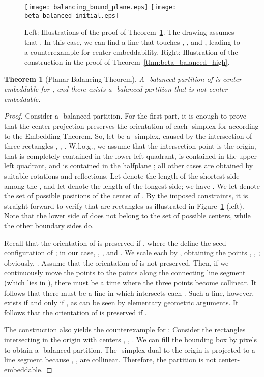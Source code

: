 \documentclass[12pt]{article}
\newtheorem{theorem}{Theorem}
\begin{document}
\begin{figure}
\centering
\texttt{[image: balancing\_bound\_plane.eps]}
\hspace{1cm}
\texttt{[image: beta\_balanced\_initial.eps]}
\caption{Left: Illustrations of the proof of Theorem~\ref{thm:planar_balancing}.
The drawing assumes that . In this case, we can find a line that touches
, , and , leading to a counterexample for center-embeddability.
Right: Illustration of the construction in the proof of Theorem~\ref{thm:beta_balanced_high}.}
\label{fig:worst_case_3d}
\label{fig:beta_balanced_plane}
\end{figure}

\begin{theorem}[Planar Balancing Theorem]\label{thm:planar_balancing}
A -balanced partition of  is center-embeddable for , and
there exists a -balanced partition that is not center-embeddable.
\end{theorem}
\begin{proof}
Consider a -balanced partition. For the first part, it is enough to prove that the center projection
preserves the orientation of each -simplex for  according to the Embedding Theorem.
So, let  be a -simplex, caused by the intersection of three rectangles , ,
. W.l.o.g., we assume that the intersection point is the origin, that  is completely
contained in the lower-left quadrant,  is contained in the upper-left quadrant,
and  is contained in the halfplane ; all other cases are obtained by 
suitable rotations and reflections. Let  denote the length of the shortest side
among the , and let  denote the length of the longest side; we have .
We let  denote the set of possible positions of the center of . 
By the imposed constraints, it is straight-forward to verify that 
are rectangles as illustrated in Figure~\ref{fig:beta_balanced_plane} (left).
Note that the lower side of  does not belong to the set of possible centers,
while the other boundary sides do.

Recall that the orientation of  is preserved if
, where the  define the seed configuration
of ; in our case, , , and .
We scale each  by , obtaining the points , , ; 
obviously, .
Assume that the orientation of  is not preserved.
Then, if we continuously move the points  to the points  along the
connecting line segment (which lies in ), there must be a time
where the three points become collinear. 
It follows that there must be a line in  
which intersects each . 
Such a line, however, exists if and only if ,
as can be seen by elementary geometric arguments.
It follows that the orientation of  is preserved if .

The construction also yields the counterexample for : Consider the rectangles
intersecting in the origin with centers
, , . We can fill the bounding box
by pixels to obtain a -balanced partition. The -simplex dual to the origin
is projected to a line segment because , ,  are collinear. Therefore,
the partition is not center-embeddable.
\end{proof}
\end{document}

